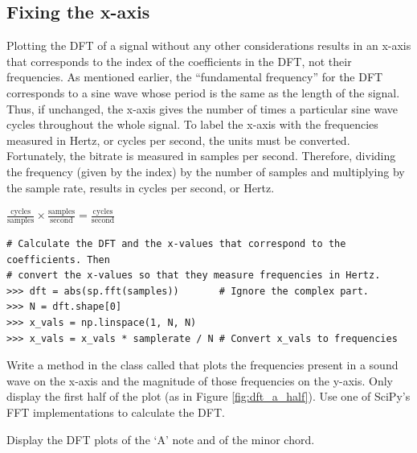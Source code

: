 \subsection*{Fixing the x-axis} %

Plotting the DFT of a signal without any other considerations results in an x-axis that corresponds to the index of the coefficients in the DFT, not their frequencies.
As mentioned earlier, the ``fundamental frequency'' for the DFT corresponds to a sine wave whose period is the same as the length of the signal.
Thus, if unchanged, the x-axis gives the number of times a particular sine wave cycles throughout the whole signal.
To label the x-axis with the frequencies measured in Hertz, or cycles per second, the units must be converted.
Fortunately, the bitrate is measured in samples per second.
Therefore, dividing the frequency (given by the index) by the number of samples and multiplying by the sample rate, results in cycles per second, or Hertz.

\begin{center}
    $\frac{\mbox{cycles}}{\mbox{samples}} \times \frac{\mbox{samples}}{\mbox{second}} = \frac{\mbox{cycles}}{\mbox{second}}$
\end{center}

\begin{lstlisting}
# Calculate the DFT and the x-values that correspond to the coefficients. Then
# convert the x-values so that they measure frequencies in Hertz.
>>> dft = abs(sp.fft(samples))       # Ignore the complex part.
>>> N = dft.shape[0]
>>> x_vals = np.linspace(1, N, N)
>>> x_vals = x_vals * samplerate / N # Convert x_vals to frequencies
\end{lstlisting}

\begin{problem}
Write a method in the  class called  that plots the frequencies present in a sound wave on the x-axis and the magnitude of those frequencies on the y-axis. 
Only display the first half of the plot (as in Figure \ref{fig:dft_a_half}).
Use one of SciPy's FFT implementations to calculate the DFT.

Display the DFT plots of the `A' note and of the minor chord.
\end{problem}


